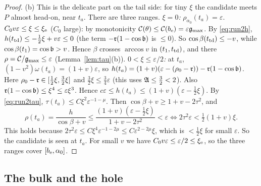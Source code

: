 \begin{proof}
(b) This is the delicate part on the tail side: for tiny $\xi$ the candidate meets $P$ almost head-on, near $t_a$. There are
three ranges.
\emph{$\xi=0$:} $\rho_{\alpha_0}(t_a)=\varepsilon$.
\emph{$C_0v\varepsilon\le\xi\le\xi_{\mathrm{e}}$} ($C_0$ large): by monotonicity $\mathcal C(\theta)\le \mathcal C(b_{\mathrm{e}})=\varepsilon\mathfrak{g}_{\max}$. By \eqref{eq:run2h},
$h(t_{\mathrm{td}})\le-\frac12\xi+v\varepsilon\le0$ (the term $-\mathfrak{r}(1-\cos\mathfrak{b})$ is $\le0$). So $\cos\beta(t_{\mathrm{td}})\le-v$, while $\cos\beta(t_1)=\cos\mathfrak{b}>v$. Hence $\beta$ crosses
$\arccos v$ in $(t_1,t_{\mathrm{td}})$, and there $\rho=\mathcal C/\mathfrak{g}_{\max}\le\varepsilon$ (Lemma~\ref{lem:tau}(b)).
\emph{$0<\xi\le\varepsilon/2$:} at $t_a$, $(1-v^2)\omega(t_a)=(1+v)\varepsilon$, so
$h(t_a)=(1+v)(\varepsilon-(\rho_0-\mathfrak{r}))-\mathfrak{r}(1-\cos\mathfrak{b})$. Here $\rho_0-\mathfrak{r}\in[\frac12\xi,\frac32\xi]$ and $\frac32\xi\le\frac34\varepsilon$
(this uses $\mathfrak{A}\le\frac32<2$). Also $\mathfrak{r}(1-\cos\mathfrak{b})\le\xi^4\le\varepsilon\xi^3$. Hence $c\varepsilon\le h(t_a)\le(1+v)(\varepsilon-\frac12\xi)$.
By \eqref{eq:run2tau}, $\tau(t_a)\le C\xi^2\varepsilon^{-1-\mu}$. Then $\cos\beta+v\ge1+v-2\tau^2$, and
\[
\rho(t_a)=\frac{h}{\cos\beta+v}\le\frac{(1+v)(\varepsilon-\frac12\xi)}{1+v-2\tau^2}<\varepsilon
\iff2\tau^2\varepsilon<\tfrac12(1+v)\xi .
\]
This holds because $2\tau^2\varepsilon\le C\xi^4\varepsilon^{-1-2\mu}\le C\varepsilon^{2-2\mu}\xi$, which is $<\frac12\xi$ for small
$\varepsilon$. So the candidate is seen at $t_a$.
For small $v$ we have $C_0v\varepsilon\le\varepsilon/2\le\xi_{\mathrm{e}}$, so the three ranges cover $[b_{\mathrm{e}},\alpha_0]$.
\end{proof}

\subsection{The bulk and the hole}\label{app:B-bulk}

